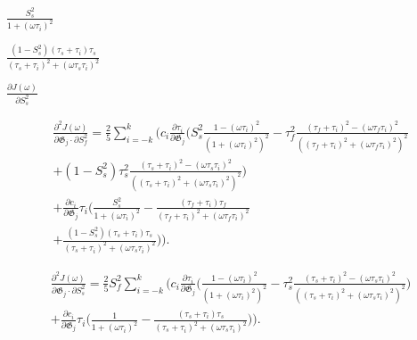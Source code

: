 \documentclass[a4paper,11pt,twoside,openright]{book}
\def\lthtmlcheckvsize{\ifdim\ht\sizebox<\vsize 
  \ifdim\wd\sizebox<\hsize\expandafter\hfill\fi \expandafter\vfill
  \else\expandafter\vss\fi}%
\begin{document}
{\newpage\clearpage
{}%
$\displaystyle {\frac{{S^2_s}}{{1 + (\omega \tau_i)^2}}}$%
\lthtmlindisplaymathZ
\lthtmlcheckvsize\clearpage}

{\newpage\clearpage
{}%
$\displaystyle {\frac{{(1 - S^2_s) (\tau_s + \tau_i)\tau_s}}{{(\tau_s + \tau_i)^2 + (\omega \tau_s \tau_i)^2}}}$%
\lthtmlindisplaymathZ
\lthtmlcheckvsize\clearpage}

{\newpage\clearpage
{}%
$\displaystyle {\frac{{\partial J(\omega)}}{{\partial S^2_s}}}$%
\lthtmlindisplaymathZ
\lthtmlcheckvsize\clearpage}

{\newpage\clearpage
{}%
\begin{multline}
    \frac{\partial^2 J(\omega)}{\partial \mathfrak{G}_j \cdot \partial S^2_f} = \frac{2}{5} \sum_{i=-k}^k \Bigg(
        c_i \frac{\partial \tau_i}{\partial \mathfrak{G}_j} \Bigg(
            S^2_s \frac{1 - (\omega \tau_i)^2}{\left(1 + (\omega \tau_i)^2 \right)^2}
            - \tau_f^2 \frac{(\tau_f + \tau_i)^2 - (\omega \tau_f \tau_i)^2}{\left((\tau_f + \tau_i)^2 + (\omega \tau_f \tau_i)^2 \right)^2} \\
            + (1 - S^2_s) \tau_s^2 \frac{(\tau_s + \tau_i)^2 - (\omega \tau_s \tau_i)^2}{\left((\tau_s + \tau_i)^2 + (\omega \tau_s \tau_i)^2 \right)^2}
        \Bigg) \\
        +  \frac{\partial c_i}{\partial \mathfrak{G}_j} \tau_i \Bigg(
            \frac{S^2_s}{1 + (\omega \tau_i)^2}
            - \frac{(\tau_f + \tau_i)\tau_f}{(\tau_f + \tau_i)^2 + (\omega \tau_f \tau_i)^2} \\
            + \frac{(1 - S^2_s)(\tau_s + \tau_i)\tau_s}{(\tau_s + \tau_i)^2 + (\omega \tau_s \tau_i)^2}
        \Bigg)
    \Bigg).
\end{multline}%
\lthtmldisplayZ
\lthtmlcheckvsize\clearpage}

{\newpage\clearpage
{}%
\begin{multline}
    \frac{\partial^2 J(\omega)}{\partial \mathfrak{G}_j \cdot \partial S^2_s} = \frac{2}{5} S^2_f \sum_{i=-k}^k \Bigg(
        c_i \frac{\partial \tau_i}{\partial \mathfrak{G}_j} \Bigg(
            \frac{1 - (\omega \tau_i)^2}{\left(1 + (\omega \tau_i)^2 \right)^2}
            - \tau_s^2 \frac{(\tau_s + \tau_i)^2 - (\omega \tau_s \tau_i)^2}{\left((\tau_s + \tau_i)^2 + (\omega \tau_s \tau_i)^2 \right)^2}
        \Bigg) \\
        +  \frac{\partial c_i}{\partial \mathfrak{G}_j} \tau_i \Bigg(
            \frac{1}{1 + (\omega \tau_i)^2}
            - \frac{(\tau_s + \tau_i)\tau_s}{(\tau_s + \tau_i)^2 + (\omega \tau_s \tau_i)^2}
        \Bigg)
    \Bigg).
\end{multline}%
\lthtmldisplayZ
\lthtmlcheckvsize\clearpage}
\end{document}
